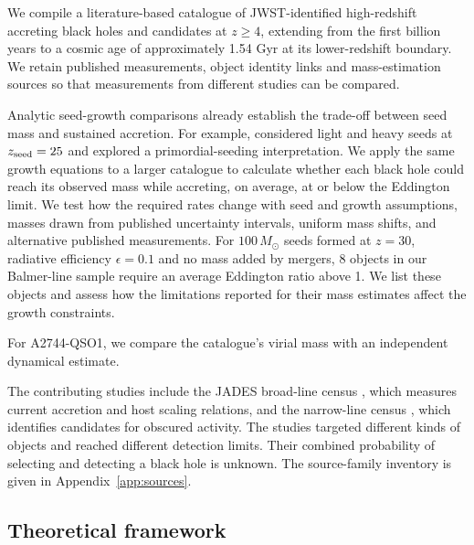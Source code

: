 \documentclass[11pt]{article}
\begin{document}
We compile a literature-based catalogue of JWST-identified high-redshift
accreting black holes and candidates at $z\geq4$, extending from the first
billion years to a cosmic age of approximately 1.54 Gyr at its lower-redshift
boundary. We retain published measurements, object identity links and
mass-estimation sources so that measurements from different studies can be compared.

Analytic seed-growth comparisons already establish the trade-off between seed
mass and sustained accretion. For example, \citet{dayal2024} considered
light and heavy seeds at $z_{\rm seed}=25$ and explored a primordial-seeding
interpretation. We apply the same growth equations to a larger catalogue to
calculate whether each black hole could reach its observed mass while accreting,
on average, at or below the Eddington limit. We test how the required rates
change with seed and growth assumptions, masses drawn from published uncertainty
intervals, uniform mass shifts, and alternative published measurements.
For $100\,M_\odot$ seeds formed at $z=30$, radiative efficiency $\epsilon=0.1$
and no mass added by mergers, 8 objects in our Balmer-line sample require an
average Eddington ratio above 1. We list these objects and assess how the
limitations reported for their mass estimates affect the growth constraints.

For A2744-QSO1, we compare the catalogue's
virial mass with an independent dynamical estimate.

The contributing studies include the JADES broad-line census
\citep{juodzbalis2026}, which measures current accretion and host scaling relations,
and the narrow-line census \citep{scholtz2025}, which identifies candidates for
obscured activity. The studies targeted different kinds of objects and reached
different detection limits. Their combined probability of selecting and detecting
a black hole is unknown. The source-family inventory is given in
Appendix~\ref{app:sources}.

\subsection{Theoretical framework}
\label{sec:theory}
\end{document}

